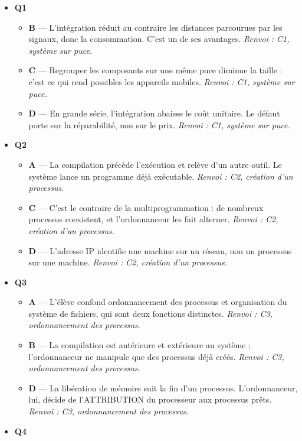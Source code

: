 \begin{itemize}
  \item \textbf{Q1}
  \begin{itemize}
    \item \textbf{B} — L'intégration réduit au contraire les distances parcourues par les signaux, donc la consommation. C'est un de ses avantages. \emph{Renvoi : C1, système sur puce.}
    \item \textbf{C} — Regrouper les composants sur une même puce diminue la taille : c'est ce qui rend possibles les appareils mobiles. \emph{Renvoi : C1, système sur puce.}
    \item \textbf{D} — En grande série, l'intégration abaisse le coût unitaire. Le défaut porte sur la réparabilité, non sur le prix. \emph{Renvoi : C1, système sur puce.}
  \end{itemize}
  \item \textbf{Q2}
  \begin{itemize}
    \item \textbf{A} — La compilation précède l'exécution et relève d'un autre outil. Le système lance un programme déjà exécutable. \emph{Renvoi : C2, création d'un processus.}
    \item \textbf{C} — C'est le contraire de la multiprogrammation : de nombreux processus coexistent, et l'ordonnanceur les fait alterner. \emph{Renvoi : C2, création d'un processus.}
    \item \textbf{D} — L'adresse IP identifie une machine sur un réseau, non un processus sur une machine. \emph{Renvoi : C2, création d'un processus.}
  \end{itemize}
  \item \textbf{Q3}
  \begin{itemize}
    \item \textbf{A} — L'élève confond ordonnancement des processus et organisation du système de fichiers, qui sont deux fonctions distinctes. \emph{Renvoi : C3, ordonnancement des processus.}
    \item \textbf{B} — La compilation est antérieure et extérieure au système ; l'ordonnanceur ne manipule que des processus déjà créés. \emph{Renvoi : C3, ordonnancement des processus.}
    \item \textbf{D} — La libération de mémoire suit la fin d'un processus. L'ordonnanceur, lui, décide de l'ATTRIBUTION du processeur aux processus prêts. \emph{Renvoi : C3, ordonnancement des processus.}
  \end{itemize}
  \item \textbf{Q4}

\end{itemize}
